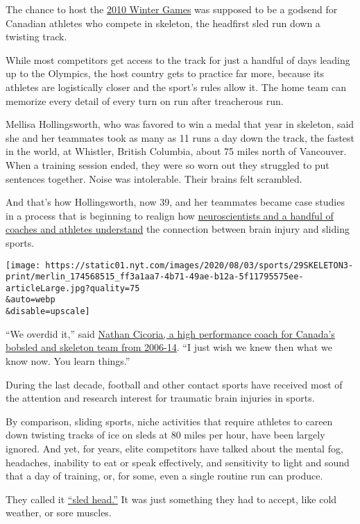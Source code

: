 The chance to host the
\href{https://www.nytimes.com/2010/02/10/sports/olympics/10podium.html}{2010
Winter Games} was supposed to be a godsend for Canadian athletes who
compete in skeleton, the headfirst sled run down a twisting track.

While most competitors get access to the track for just a handful of
days leading up to the Olympics, the host country gets to practice far
more, because its athletes are logistically closer and the sport's rules
allow it. The home team can memorize every detail of every turn on run
after treacherous run.

Mellisa Hollingsworth, who was favored to win a medal that year in
skeleton, said she and her teammates took as many as 11 runs a day down
the track, the fastest in the world, at Whistler, British Columbia,
about 75 miles north of Vancouver. When a training session ended, they
were so worn out they struggled to put sentences together. Noise was
intolerable. Their brains felt scrambled.

And that's how Hollingsworth, now 39, and her teammates became case
studies in a process that is beginning to realign how
\href{https://www.ncbi.nlm.nih.gov/pmc/articles/PMC6153360/}{neuroscientists
and a handful of coaches and athletes understand} the connection between
brain injury and sliding sports.

\texttt{[image: https://static01.nyt.com/images/2020/08/03/sports/29SKELETON3-print/merlin\_174568515\_ff3a1aa7-4b71-49ae-b12a-5f11795575ee-articleLarge.jpg?quality=75\\\&auto=webp\\\&disable=upscale]}

``We overdid it,'' said
\href{https://olympic.ca/2013/08/07/how-the-cfl-is-redefining-bobsleigh-in-canada/}{Nathan
Cicoria, a high performance coach for Canada's bobsled and skeleton team
from 2006-14}. ``I just wish we knew then what we know now. You learn
things.''

During the last decade, football and other contact sports have received
most of the attention and research interest for traumatic brain injuries
in sports.

By comparison, sliding sports, niche activities that require athletes to
careen down twisting tracks of ice on sleds at 80 miles per hour, have
been largely ignored. And yet, for years, elite competitors have talked
about the mental fog, headaches, inability to eat or speak effectively,
and sensitivity to light and sound that a day of training, or, for some,
even a single routine run can produce.

They called it
\href{https://www.nytimes.com/2020/07/26/sports/olympics/olympics-bobsled-suicide-brain-injuries.html}{``sled
head.''} It was just something they had to accept, like cold weather, or
sore muscles.

